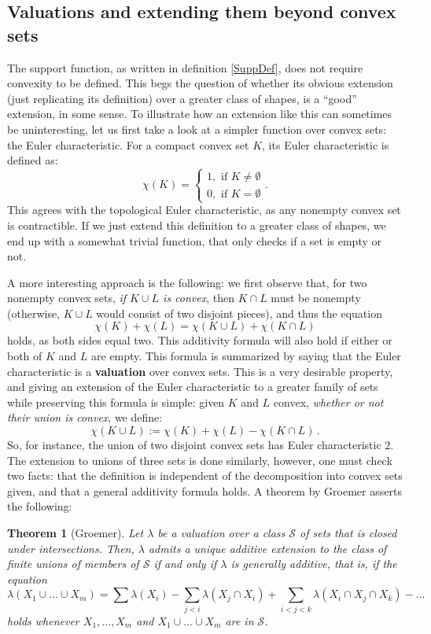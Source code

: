 \documentclass[a4paper]{article}
\newtheorem{theorem}{Theorem}[section]
\begin{document}
\subsection{Valuations and extending them beyond convex sets}
\label{valuations}

The support function, as written in definition \ref{SuppDef}, does not require convexity to be defined. This begs the question of whether its obvious extension (just replicating its definition) over a greater class of shapes, is a ``good'' extension, in some sense. To illustrate how an extension like this can sometimes be uninteresting, let us first take a look at a simpler function over convex sets: the Euler characteristic. For a compact convex set $K$, its Euler characteristic is defined as:
\[ \chi(K)=\begin{cases}
	1, \text{ if } K \neq \emptyset \\
	0, \text{ if } K = \emptyset
\end{cases}. \]
This agrees with the topological Euler characteristic, as any nonempty convex set is contractible. If we just extend this definition to a greater class of shapes, we end up with a somewhat trivial function, that only checks if a set is empty or not.

A more interesting approach is the following: we first observe that, for two nonempty convex sets, \emph{if $K \cup L$ is convex}, then $K \cap L$ must be nonempty (otherwise, $K \cup L$ would consist of two disjoint pieces), and thus the equation \[\chi(K)+\chi(L)=\chi(K \cup L)+\chi(K \cap L)\] holds, as both sides equal two. This additivity formula will also hold if either or both of $K$ and $L$ are empty. This formula is summarized by saying that the Euler characteristic is a \textbf{valuation} over convex sets. This is a very desirable property, and giving an extension of the Euler characteristic to a greater family of sets while preserving this formula is simple: given $K$ and $L$ convex, \emph{whether or not their union is convex}, we define:
\[ \chi(K \cup L):=\chi(K) +\chi(L) -\chi(K \cap L)\, .\]
So, for instance, the union of two disjoint convex sets has Euler characteristic $2$. The extension to unions of three sets is done similarly, however, one must check two facts: that the definition is independent of the decomposition into convex sets given, and that a general additivity formula holds. A theorem by Groemer \cite{groemer1978extension} asserts the following:
\begin{theorem}[Groemer]
	\label{Groemer}
	Let $\lambda$ be a valuation over a class $\mathcal S$ of sets that is closed under intersections. Then, $\lambda$ admits a unique additive extension to the class of finite unions of members of $\mathcal S$ if and only if $\lambda$ is generally additive, that is, if the equation
	\[ \lambda(X_1 \cup ... \cup X_m)=\sum \lambda (X_i) -\sum_{j<i} \lambda (X_j \cap X_i)+\sum_{i<j<k} \lambda(X_i \cap X_j \cap X_k) -\dots \]
	holds whenever $X_1,...,X_m$ and $X_1 \cup ... \cup X_m$ are in $\mathcal S$.
\end{theorem}
\end{document}
